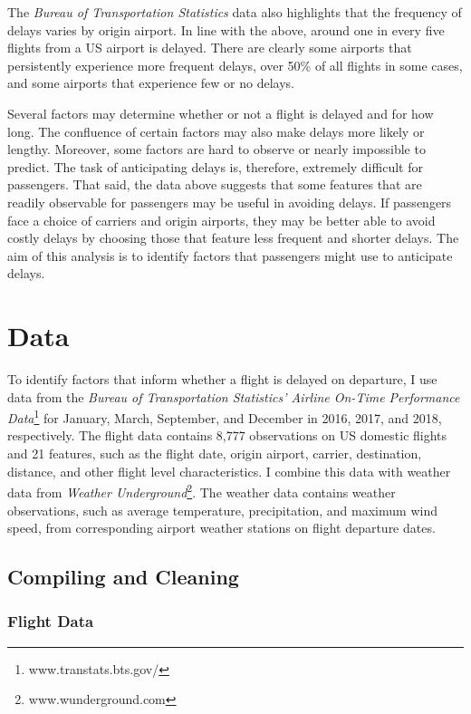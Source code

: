 \documentclass[
]{article}
\begin{document}
The \textit{Bureau of Transportation Statistics} data also highlights
that the frequency of delays varies by origin airport. In line with the
above, around one in every five flights from a US airport is delayed.
There are clearly some airports that persistently experience more
frequent delays, over 50\% of all flights in some cases, and some
airports that experience few or no delays.

Several factors may determine whether or not a flight is delayed and for
how long. The confluence of certain factors may also make delays more
likely or lengthy. Moreover, some factors are hard to observe or nearly
impossible to predict. The task of anticipating delays is, therefore,
extremely difficult for passengers. That said, the data above suggests
that some features that are readily observable for passengers may be
useful in avoiding delays. If passengers face a choice of carriers and
origin airports, they may be better able to avoid costly delays by
choosing those that feature less frequent and shorter delays. The aim of
this analysis is to identify factors that passengers might use to
anticipate delays.

\newpage 
\section{Data}

To identify factors that inform whether a flight is delayed on
departure, I use data from the
\textit{Bureau of Transportation Statistics' Airline On-Time Performance Data}\footnote{www.transtats.bts.gov/}
for January, March, September, and December in 2016, 2017, and 2018,
respectively. The flight data contains 8,777 observations on US domestic
flights and 21 features, such as the flight date, origin airport,
carrier, destination, distance, and other flight level characteristics.
I combine this data with weather data from
\textit{Weather Underground}\footnote{www.wunderground.com}. The weather
data contains weather observations, such as average temperature,
precipitation, and maximum wind speed, from corresponding airport
weather stations on flight departure dates.

\subsection{Compiling and Cleaning}

\subsubsection{Flight Data}
\end{document}
